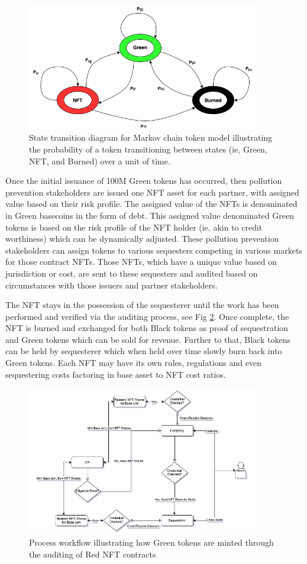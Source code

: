 \documentclass{article}
\begin{document}
\begin{figure}[h]
\centering
\includegraphics[width=4in]{state_diagram.png}
\caption{State transition diagram for Markov chain token model illustrating the probability of a token transitioning between states (ie, Green, NFT, and Burned) over a unit of time.} 
\label{fig:state_diagram}
\end{figure} 

Once the initial issuance of 100M Green tokens has occurred, then pollution prevention stakeholders are issued one NFT asset for each partner, with assigned value based on their risk profile. The assigned value of the NFTs is denominated in Green basecoins in the form of debt. This assigned value denominated Green tokens is based on the risk profile of the NFT holder (ie, akin to credit worthiness) which can be dynamically adjusted. These  pollution prevention stakeholders can assign tokens to various sequesters competing in various markets for those contract NFTs. Those NFTs, which have a unique value based on jurisdiction or cost, are sent to these sequesters and audited based on circumstances with those issuers and partner stakeholders.

The NFT stays in the possession of the sequesterer until the work has been performed and verified via the auditing process, see Fig \ref{fig:red_to_green}. Once complete, the NFT is burned and exchanged for both Black tokens as proof of sequestration and Green tokens which can be sold for revenue. Further to that, Black tokens can be held by sequesterer which when held over time slowly burn back into Green tokens. Each NFT may have its
own rules, regulations and even sequestering costs factoring in base asset to NFT cost ratios.

\begin{figure}[h]
\centering
\includegraphics[width=4in]{red_to_green.png}
\caption{ Process workflow illustrating how Green tokens are minted through the auditing of Red NFT contracts } 
\label{fig:red_to_green}
\end{figure} 
\end{document}
